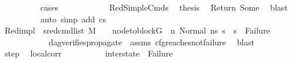 \begin{isabellebody}
\ \ \ \ \ \ \ \ \isamarkupfalse%
\ cases\isanewline
\ \ \ \ \ \ \ \ \ \ \isamarkupfalse%
\ RedSimpleCmds\ \isamarkupfalse%
\ {\isacharquery}{\kern0pt}thesis\ \isamarkupfalse%
\ Return\ Some\ \isamarkupfalse%
\ blast\isanewline
\ \ \ \ \ \ \ \ \isamarkupfalse%
\ {\isacharparenleft}{\kern0pt}auto\ simp\ add{\isacharcolon}{\kern0pt}\ {\isacartoucheopen}cs{}\ {\isasymnoteq}\ {\isacharbrackleft}{\kern0pt}{\isacharbrackright}{\kern0pt}{\isacartoucheclose}{\isacharparenright}{\kern0pt}\isanewline
\isanewline
\ \ \ \ \ \ \ \ \isamarkupfalse%
\ Red{\isacharunderscore}{\kern0pt}impl{\isacharcolon}{\kern0pt}\ {\isachardoublequoteopen}{\isacharparenleft}{\kern0pt}{\isasymAnd}\ s{}{\isacharprime}{\kern0pt}{\isachardot}{\kern0pt}{\isacharparenleft}{\kern0pt}{\isacharparenleft}{\kern0pt}red{\isacharunderscore}{\kern0pt}cmd{\isacharunderscore}{\kern0pt}list\ M\ {\isasymLambda}\ {\isasymGamma}\ {\isasymOmega}\ {\isacharparenleft}{\kern0pt}node{\isacharunderscore}{\kern0pt}to{\isacharunderscore}{\kern0pt}block{\isacharparenleft}{\kern0pt}G{\isacharparenright}{\kern0pt}\ {\isacharbang}{\kern0pt}\ n{\isacharparenright}{\kern0pt}\ {\isacharparenleft}{\kern0pt}Normal\ ns{}{\isacharparenright}{\kern0pt}\ s{}{\isacharprime}{\kern0pt}{\isacharparenright}{\kern0pt}\ {\isasymLongrightarrow}\ {\isacharparenleft}{\kern0pt}s{}{\isacharprime}{\kern0pt}\ {\isasymnoteq}\ Failure{\isacharparenright}{\kern0pt}{\isacharparenright}{\kern0pt}{\isacharparenright}{\kern0pt}{\isachardoublequoteclose}\ \isanewline
\ \ \ \ \ \ \ \ \ \ \isamarkupfalse%
\ dag{\isacharunderscore}{\kern0pt}verifies{\isacharunderscore}{\kern0pt}propagate{\isacharunderscore}{\kern0pt}{}\ \ assms{\isacharparenleft}{\kern0pt}{}{\isacharparenright}{\kern0pt}\ cfg{\isacharunderscore}{\kern0pt}reaches{\isacharunderscore}{\kern0pt}not{\isacharunderscore}{\kern0pt}failure\ \isamarkupfalse%
\ blast\isanewline
\isanewline
\ \ \ \ \ \ \ \ \isamarkupfalse%
\ step\ \isamarkupfalse%
\ local{\isacharunderscore}{\kern0pt}corr{\isacharcolon}{\kern0pt}\isanewline
\ \ \ \ \ \ \ \ \ \ {\isachardoublequoteopen}inter{\isacharunderscore}{\kern0pt}state\ {\isasymnoteq}\ Failure\ \ {\isasymand}\isanewline

\end{isabellebody}
